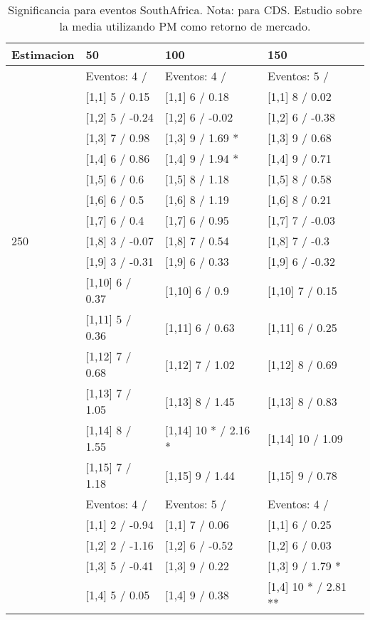 \begin{table}

\caption{Significancia para eventos SouthAfrica. Nota: para CDS. Estudio sobre la media utilizando PM como retorno de mercado.}
\centering
\begin{tabular}[t]{llll}
\toprule
Estimacion & 50 & 100 & 150\\
\midrule
 & Eventos:  4 / & Eventos:  4 / & Eventos:  5 /\\
 & {}[1,1] 5  / 0.15 & {}[1,1] 6  / 0.18 & {}[1,1] 8  / 0.02\\
 & {}[1,2] 5  / -0.24 & {}[1,2] 6  / -0.02 & {}[1,2] 6  / -0.38\\
 & {}[1,3] 7  / 0.98 & {}[1,3] 9  / 1.69 * & {}[1,3] 9  / 0.68\\
 & {}[1,4] 6  / 0.86 & {}[1,4] 9  / 1.94 * & {}[1,4] 9  / 0.71\\
\addlinespace
 & {}[1,5] 6  / 0.6 & {}[1,5] 8  / 1.18 & {}[1,5] 8  / 0.58\\
 & {}[1,6] 6  / 0.5 & {}[1,6] 8  / 1.19 & {}[1,6] 8  / 0.21\\
 & {}[1,7] 6  / 0.4 & {}[1,7] 6  / 0.95 & {}[1,7] 7  / -0.03\\
250 & {}[1,8] 3  / -0.07 & {}[1,8] 7  / 0.54 & {}[1,8] 7  / -0.3\\
 & {}[1,9] 3  / -0.31 & {}[1,9] 6  / 0.33 & {}[1,9] 6  / -0.32\\
\addlinespace
 & {}[1,10] 6  / 0.37 & {}[1,10] 6  / 0.9 & {}[1,10] 7  / 0.15\\
 & {}[1,11] 5  / 0.36 & {}[1,11] 6  / 0.63 & {}[1,11] 6  / 0.25\\
 & {}[1,12] 7  / 0.68 & {}[1,12] 7  / 1.02 & {}[1,12] 8  / 0.69\\
 & {}[1,13] 7  / 1.05 & {}[1,13] 8  / 1.45 & {}[1,13] 8  / 0.83\\
 & {}[1,14] 8  / 1.55 & {}[1,14] 10 * / 2.16 * & {}[1,14] 10  / 1.09\\
\addlinespace
 & {}[1,15] 7  / 1.18 & {}[1,15] 9  / 1.44 & {}[1,15] 9  / 0.78\\
 & Eventos:  4 / & Eventos:  5 / & Eventos:  4 /\\
 & {}[1,1] 2  / -0.94 & {}[1,1] 7  / 0.06 & {}[1,1] 6  / 0.25\\
 & {}[1,2] 2  / -1.16 & {}[1,2] 6  / -0.52 & {}[1,2] 6  / 0.03\\
 & {}[1,3] 5  / -0.41 & {}[1,3] 9  / 0.22 & {}[1,3] 9  / 1.79 *\\
\addlinespace
 & {}[1,4] 5  / 0.05 & {}[1,4] 9  / 0.38 & {}[1,4] 10 * / 2.81 **\\

\end{tabular}
\end{table}
